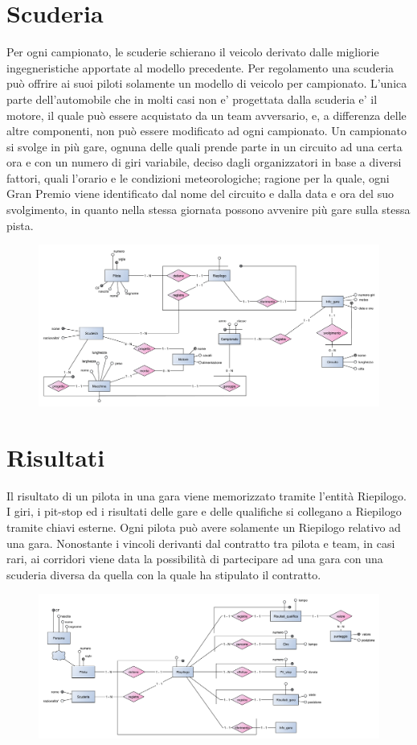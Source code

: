 \documentclass[a4paper,12pt]{report}
\begin{document}
		\section{Scuderia}
	Per ogni campionato, le scuderie schierano il veicolo derivato dalle migliorie ingegneristiche apportate al modello
	precedente. Per regolamento una scuderia può offrire ai suoi piloti solamente un modello di veicolo per campionato.
	L'unica parte dell'automobile che in molti casi non e' progettata dalla scuderia e' il motore, il quale può essere
	acquistato da un team avversario, e, a differenza delle altre componenti, non può essere modificato ad ogni campionato.
	Un campionato si svolge in più gare, ognuna delle quali prende parte in un circuito ad una certa ora e con un numero
	di giri variabile, deciso dagli organizzatori in base a diversi fattori, quali l'orario e le condizioni meteorologiche; ragione per la quale, ogni Gran Premio viene identificato dal nome del circuito e dalla data e ora del suo svolgimento, in quanto nella stessa giornata possono avvenire più gare sulla stessa pista.
	\begin{figure}[htbp]
		\centering
		\includegraphics[scale=0.8]{copies/scheletro2.pdf}
	\end{figure}
		\section{Risultati}
	Il risultato di un pilota in una gara viene memorizzato tramite l'entità Riepilogo.
	I giri, i pit-stop ed i risultati delle gare e delle qualifiche si collegano a Riepilogo tramite chiavi esterne.
	Ogni pilota può avere solamente un Riepilogo relativo ad una gara.
	Nonostante i vincoli derivanti dal contratto tra pilota e team, in casi rari, ai corridori viene data la possibilità
	di partecipare ad una gara con una scuderia diversa da quella con la quale ha stipulato il contratto.
	\begin{figure}[htbp]
		\centering
		\includegraphics[scale=0.8]{copies/scheletro3.pdf}
	\end{figure}
\end{document}
